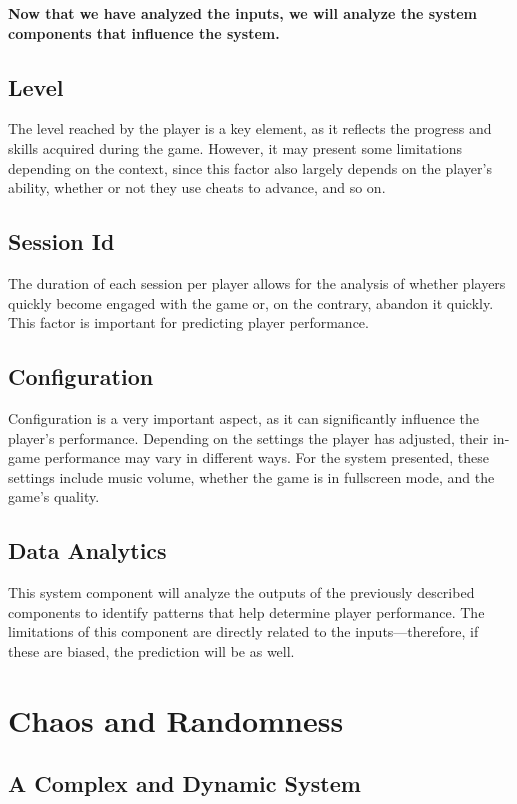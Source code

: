 \documentclass{article}
\begin{document}
  \textbf{Now that we have analyzed the inputs, we will analyze the system components that influence the system.}
  
  \subsection*{Level}
  The level reached by the player is a key element, as it reflects the progress and skills acquired during the game. However, it may present some limitations depending on the context, since this factor also largely depends on the player's ability, whether or not they use cheats to advance, and so on.
  
  \subsection*{Session Id}
  The duration of each session per player allows for the analysis of whether players quickly become engaged with the game or, on the contrary, abandon it quickly. This factor is important for predicting player performance.
  
  \subsection*{Configuration}
  Configuration is a very important aspect, as it can significantly influence the player's performance. Depending on the settings the player has adjusted, their in-game performance may vary in different ways. For the system presented, these settings include music volume, whether the game is in fullscreen mode, and the game’s quality.
  
  \subsection*{Data Analytics}
  This system component will analyze the outputs of the previously described components to identify patterns that help determine player performance. The limitations of this component are directly related to the inputs—therefore, if these are biased, the prediction will be as well.
  
  \section*{Chaos and Randomness}

  \subsection*{A Complex and Dynamic System}
\end{document}
